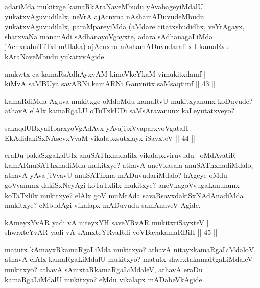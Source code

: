 \begin{artha}
adariMda mukitxge kamaRkAraNaveMbudu yAvabageyiMdalU yukatxvAguvudilalx, neVrA ajAcnxna nAshamADuvudeMbudu yukatxvAguvudilalx, paraMpareyiMda (aMdare citatxshudidhx, veYrAgayx, sharxvaNa mananAdi sAdhanayoVgayxte, adara sAdhanagaLiMda jAcnxnahuTiTxI mUlaka) ajAcnxna nAshamADuvudaralilx I kamaRvu kAraNaveMbudu yukatxvAgide.
\end{artha}


\begin{shl}
mukwtx ca kamaRsAdhAyxyAM kimeVkeYkaM vimukitxdamf |\\
kiMvA saMBUya savARNi kamARNi Ganxnitx saMsaqtimf \hfill || 43 ||
\end{shl}

\begin{artha}
kamaRdiMda Aguva mukitxge oMdoMdu kamaRvU mukitxyanunx koDuvude? athavA elAlx kamaRgaLU oTuTxkUDi saMsAravanunx kaLeyutatxveyo?
\end{artha}

\begin{shl}
sakaqdUBxyaHparxyoVgAdAvx yAvajijxVvaparxyoVgataH |\\
EkAdidakiSxNAsevxVvaM vikalapxsutxlayx iSayxteV \hfill || 44 ||
\end{shl}

\begin{artha}
eraDu pakaSxgaLalUlx anuSAThxnadalilx vikalapxviruvudu-- oMdAvatiR kamARnuSAThxnadiMda mukitxye? athavA aneVkasala anuSAThxnadiMdalo, athavA yAva jiVvavU anuSAThxna mADuvudariMdalo? hAgeye oMdu goVvanunx dakiSxNeyAgi koTaTxlilx mukitxye? aneVkagoVvugaLanununx  koTaTxlilx mukitxye? elAlx goV muMtAda savaRsavxdakiSxNAdAnadiMda mukitxye? eMbudAgi vikalapx mADuvudu samAnaveV Agide.
\end{artha}

\begin{shl}
kAmeyxYvAR yadi vA niteyxYH saveYRvAR mukitxriSayxteV |\\
shwrxteYvAR yadi vA sAmxteYRyaRdi voVBayakamaRBiH \hfill || 45 ||
\end{shl}

\begin{artha}
matutx kAmayxRkamaRgaLiMda mukitxyo? athavA nitayxkamaRgaLiMdaloV, athavA elAlx kamaRgaLiMdalU mukitxyo? matutx shwrxtakamaRgaLiMdaleV mukitxyo? athavA sAmxtaRkamaRgaLiMdaleV, athavA eraDu kamaRgaLiMdalU mukitxyo? eMdu vikalapx mADabeVkAgide. 
\end{artha}


